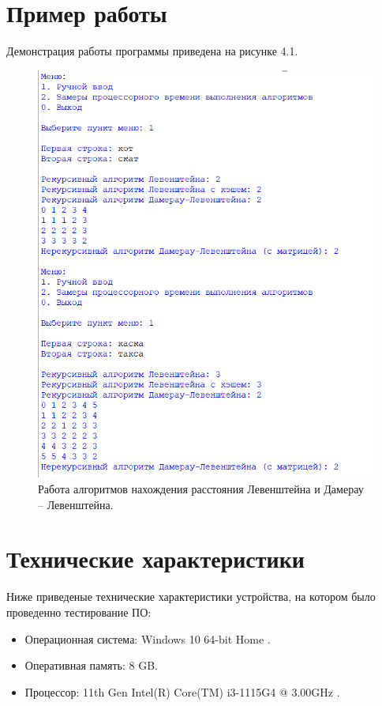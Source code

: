 \documentclass[12pt]{report}
\begin{document}
	\section{Пример работы}
	
	Демонстрация работы программы приведена на рисунке 4.1.
	
	\begin{figure}[h]
		\begin{center}
			\includegraphics[scale=0.5]{example.png}
			\caption{Работа алгоритмов нахождения расстояния Левенштейна и Дамерау -- Левенштейна.}
		\end{center}
	\end{figure}
	
	\section{Технические характеристики}
	
	Ниже приведеные технические характеристики устройства, на котором было проведенно тестирование ПО:
	
	\begin{itemize}
		
		\item Операционная система: Windows 10 64-bit Home \cite{home}.
		
		\item Оперативная память: 8 GB.
		
		\item Процессор: 11th Gen Intel(R) Core(TM) i3-1115G4 @ 3.00GHz
		\cite{i3}.
		
	\end{itemize}
	
\end{document}
